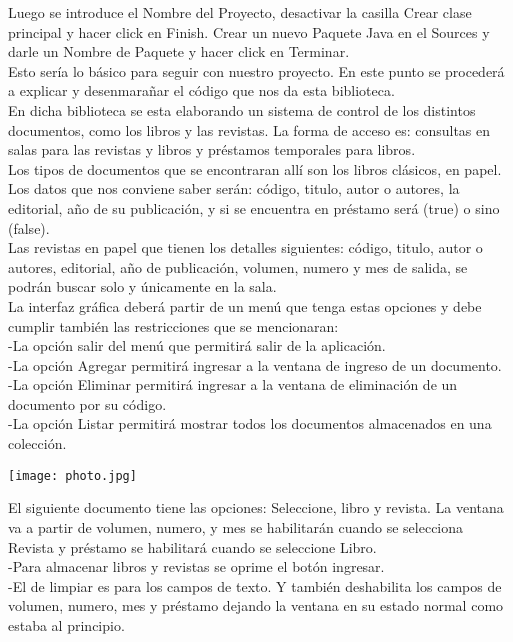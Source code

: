 \documentclass{article}
\begin{document}
\begin{multicols}{2}
Luego se introduce el Nombre del Proyecto, desactivar la casilla Crear clase principal y hacer click en Finish.
 Crear un nuevo Paquete Java en el Sources y darle un Nombre de Paquete y hacer click en Terminar. \\
Esto sería lo básico para seguir con nuestro proyecto. En este punto se procederá a explicar y desenmarañar el código que nos da esta biblioteca. \\
En dicha biblioteca se esta elaborando un sistema de control de los distintos documentos, como los libros y las revistas. La forma de acceso es: consultas en salas para las revistas y libros y préstamos temporales para libros. \\
Los tipos de documentos que se encontraran allí son los libros clásicos, en papel. Los datos que nos conviene saber serán: código, titulo, autor o autores, la editorial, año de su publicación, y si se encuentra en préstamo será (true) o sino (false). \\
Las revistas en papel que tienen los detalles siguientes: código, titulo, autor o autores, editorial, año de publicación, volumen, numero y mes de salida, se podrán buscar solo y únicamente en la sala. \\
La interfaz gráfica deberá partir de un menú que tenga estas opciones y debe cumplir también las restricciones que se mencionaran: \\
-La opción salir del menú que permitirá salir de la aplicación. \\
-La opción Agregar permitirá ingresar a la ventana de ingreso de un documento. \\
-La opción Eliminar permitirá ingresar a la ventana de eliminación de un documento por su código. \\
-La opción Listar permitirá mostrar todos los documentos almacenados en una colección. \\
\begin{center}
\texttt{[image: photo.jpg]} 
\end{center} 
El siguiente documento tiene las opciones: Seleccione, libro y revista. La ventana va a partir de volumen, numero, y mes se habilitarán cuando se selecciona Revista y préstamo se habilitará cuando se seleccione Libro. \\
-Para almacenar libros y revistas se oprime el botón ingresar. \\
-El de limpiar es para los campos de texto. Y también deshabilita los campos de volumen, numero, mes y préstamo dejando la ventana en su estado normal como estaba al principio. \\

\end{multicols}
\end{document}
